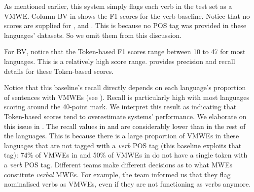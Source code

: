 \documentclass[output=paper,modfonts,nonflat,draftmode]{langsci/langscibook}
\begin{document}
As mentioned earlier, this system simply flags each verb in the test set as a VMWE. Column BV in  shows the F1 scores for the verb baseline. Notice that no scores are supplied for ,  and . This is because no POS tag was provided in these languages' datasets. So we omit them from this discussion.


For BV, notice that the Token-based F1 scores range between 10 to 47 for most languages. This is a relatively high score range.  provides precision and recall details for these Token-based scores. 

\begin{table}
\caption{\label{tbl:random-token-scores}Token-based scores for the Verb baseline}

{{}}%
\setlength\tabcolsep{2.0pt} %
\end{table}


Notice that this baseline's recall directly depends on each language's proportion of sentences with VMWEs (see ). Recall is particularly high with most languages scoring around the 40-point mark. We interpret this result as indicating that Token-based scores tend to overestimate systems' performance. We elaborate on this issue in . The recall values in  and  are considerably lower than in the rest of the languages. This is because there is a large proportion of VMWEs in these languages that are not tagged with a \emph{verb} POS tag (this baseline exploits that tag): 74\% of VMWEs in  and 50\% of VMWEs in  do not have a single token with a \emph{verb} POS tag. Different teams make different decisions as to what MWEs constitute \emph{verbal} MWEs. For example, the  team informed us that they flag nominalised verbs as VMWEs, even if they are not functioning as verbs anymore.
\end{document}
